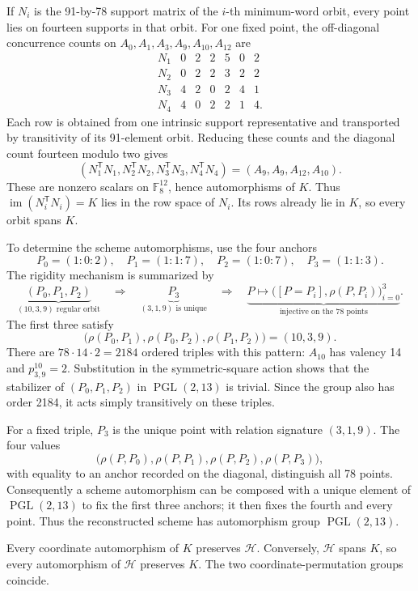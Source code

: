 \documentclass[11pt]{article}
\theoremstyle{definition}
\theoremstyle{remark}
\newcommand{\F}{\mathbb F}
\newcommand{\PGL}{\operatorname{PGL}}
\begin{document}
If \(N_i\) is the 91-by-78 support matrix of the \(i\)-th minimum-word
orbit, every point lies on fourteen supports in that orbit.  For one fixed
point, the off-diagonal concurrence counts on
\(A_0,A_1,A_3,A_9,A_{10},A_{12}\) are
\[
\begin{array}{c|rrrrrr}
N_1&0&2&2&5&0&2\\
N_2&0&2&2&3&2&2\\
N_3&4&2&0&2&4&1\\
N_4&4&0&2&2&1&4.
\end{array}
\]
Each row is obtained from one intrinsic support representative and transported
by transitivity of its 91-element orbit.  Reducing these counts and the
diagonal count fourteen modulo two gives
\[
 (N_1^{\mathsf T}N_1,N_2^{\mathsf T}N_2,
   N_3^{\mathsf T}N_3,N_4^{\mathsf T}N_4)
 =(A_9,A_9,A_{12},A_{10}).
\]
These are nonzero scalars on \(\F_8^{12}\), hence automorphisms of \(K\).
Thus \(\operatorname{im}(N_i^{\mathsf T}N_i)=K\) lies in the row space of
\(N_i\).  Its rows already lie in \(K\), so every orbit spans \(K\).

To determine the scheme automorphisms, use the four anchors
\[
 P_0=(1:0:2),\quad P_1=(1:1:7),\quad
 P_2=(1:0:7),\quad P_3=(1:1:3).
\]
The rigidity mechanism is summarized by
\[
 \underbrace{(P_0,P_1,P_2)}_{(10,3,9)\text{ regular orbit}}
 \quad\Longrightarrow\quad
 \underbrace{P_3}_{(3,1,9)\text{ is unique}}
 \quad\Longrightarrow\quad
 \underbrace{P\longmapsto
   \bigl([P=P_i],\rho(P,P_i)\bigr)_{i=0}^{3}}
   _{\text{injective on the 78 points}}.
\]
The first three satisfy
\[
 \bigl(\rho(P_0,P_1),\rho(P_0,P_2),\rho(P_1,P_2)\bigr)=(10,3,9).
\]
There are
\(78\cdot14\cdot2=2184\) ordered triples with this pattern: \(A_{10}\)
has valency 14 and \(p_{3,9}^{10}=2\).  Substitution in the symmetric-square
action shows that the stabilizer of \((P_0,P_1,P_2)\) in
\(\PGL(2,13)\) is trivial.  Since the group also has order 2184, it acts
simply transitively on these triples.

For a fixed triple, \(P_3\) is the unique point with relation signature
\((3,1,9)\).  The four values
\[
 \bigl(\rho(P,P_0),\rho(P,P_1),\rho(P,P_2),\rho(P,P_3)\bigr),
\]
with equality to an anchor recorded on the diagonal, distinguish all 78
points.  Consequently a scheme automorphism can be composed with a unique
element of \(\PGL(2,13)\) to fix the first three anchors; it then fixes the
fourth and every point.  Thus the reconstructed scheme has automorphism
group \(\PGL(2,13)\).

Every coordinate automorphism of \(K\) preserves \(\mathcal H\).
Conversely, \(\mathcal H\) spans \(K\), so every automorphism of
\(\mathcal H\) preserves \(K\).  The two coordinate-permutation groups
coincide.
\end{document}
